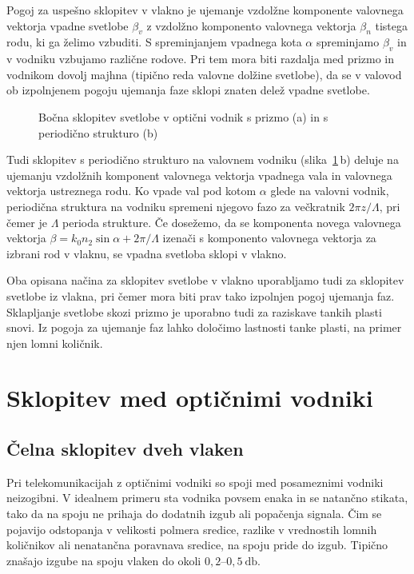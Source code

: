 Pogoj za uspešno 
sklopitev v vlakno je ujemanje vzdolžne komponente valovnega vektorja vpadne svetlobe $\beta_v$ 
z vzdolžno komponento valovnega vektorja $\beta_n$ tistega rodu, ki ga želimo vzbuditi. 
S spreminjanjem vpadnega kota $\alpha$ spreminjamo $\beta_v$ in v vodniku vzbujamo različne rodove. 
Pri tem mora biti razdalja med prizmo in vodnikom dovolj majhna (tipično reda valovne dolžine svetlobe), 
da se v valovod ob izpolnjenem pogoju ujemanja faze sklopi znaten delež vpadne svetlobe.

\begin{figure}[ht]
\centering
\def\svgwidth{140truemm} 
 
\caption{Bočna sklopitev svetlobe v optični vodnik s prizmo (a) in s periodično strukturo (b)}
\label{fig:coupler}
\end{figure}
Tudi sklopitev s periodično strukturo na valovnem vodniku (slika~\ref{fig:coupler}\,b) deluje na 
ujemanju vzdolžnih komponent valovnega vektorja vpadnega vala in valovnega vektorja ustreznega rodu.
Ko vpade val pod kotom $\alpha$ glede na valovni vodnik, periodična struktura na vodniku 
spremeni njegovo fazo za večkratnik $2 \pi z/\Lambda$, pri čemer je $\Lambda$ perioda strukture.
Če dosežemo, da se komponenta novega valovnega vektorja $\beta = k_0 n_2 \sin \alpha+ 
2 \pi/\Lambda$ izenači s  komponento valovnega vektorja za izbrani rod v vlaknu, 
se vpadna svetloba sklopi v vlakno.

\begin{remark}
 Oba opisana načina za sklopitev svetlobe v vlakno uporabljamo tudi za sklopitev svetlobe 
 iz vlakna, pri čemer mora biti prav tako izpolnjen pogoj ujemanja faz. 
 Sklapljanje svetlobe skozi prizmo je uporabno tudi za raziskave tankih plasti snovi. 
 Iz pogoja za ujemanje faz lahko določimo lastnosti tanke plasti, na primer njen lomni količnik. 
\end{remark}

\section{Sklopitev med optičnimi vodniki}
\subsection*{Čelna sklopitev dveh vlaken}
Pri telekomunikacijah z optičnimi vodniki so spoji med posameznimi vodniki neizogibni.
V idealnem primeru sta vodnika povsem enaka in se natančno stikata, tako da na spoju
ne prihaja do dodatnih izgub ali popačenja signala. Čim se pojavijo odstopanja 
v velikosti polmera sredice, razlike v vrednostih lomnih količnikov ali nenatančna poravnava 
sredice, na spoju pride do izgub. Tipično znašajo izgube na spoju vlaken do okoli 
$0,2$--$0,5~\si{\decibel}$.

